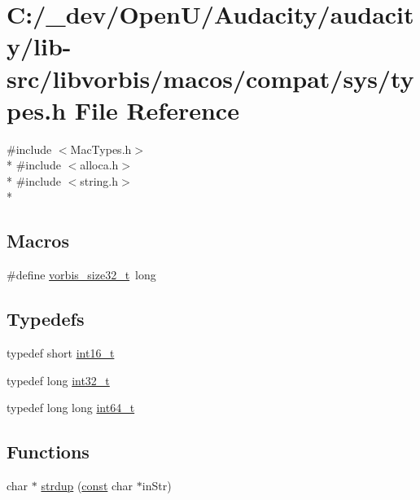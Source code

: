 \hypertarget{lib-src_2libvorbis_2macos_2compat_2sys_2_types_8h}{}\section{C\+:/\+\_\+dev/\+Open\+U/\+Audacity/audacity/lib-\/src/libvorbis/macos/compat/sys/types.h File Reference}
\label{lib-src_2libvorbis_2macos_2compat_2sys_2_types_8h}
{\ttfamily \#include $<$Mac\+Types.\+h$>$}\\*
{\ttfamily \#include $<$alloca.\+h$>$}\\*
{\ttfamily \#include $<$string.\+h$>$}\\*
\subsection*{Macros}
\begin{DoxyCompactItemize}
\item 
\#define \hyperlink{lib-src_2libvorbis_2macos_2compat_2sys_2_types_8h_a4deca0c22e2a7e8d676718907779a65a}{vorbis\+\_\+size32\+\_\+t}~long
\end{DoxyCompactItemize}
\subsection*{Typedefs}
\begin{DoxyCompactItemize}
\item 
typedef short \hyperlink{lib-src_2libvorbis_2macos_2compat_2sys_2_types_8h_aa343fa3b3d06292b959ffdd4c4703b06}{int16\+\_\+t}
\item 
typedef long \hyperlink{lib-src_2libvorbis_2macos_2compat_2sys_2_types_8h_a0d2e949ab6a1bb62f1b295cc79bc1f60}{int32\+\_\+t}
\item 
typedef long long \hyperlink{lib-src_2libvorbis_2macos_2compat_2sys_2_types_8h_a996e72f71b11a5bb8b3b7b6936b1516d}{int64\+\_\+t}
\end{DoxyCompactItemize}
\subsection*{Functions}
\begin{DoxyCompactItemize}
\item 
char $\ast$ \hyperlink{lib-src_2libvorbis_2macos_2compat_2sys_2_types_8h_a8c67487a889774f479e3dc226b4f27df}{strdup} (\hyperlink{getopt1_8c_a2c212835823e3c54a8ab6d95c652660e}{const} char $\ast$in\+Str)
\end{DoxyCompactItemize}


